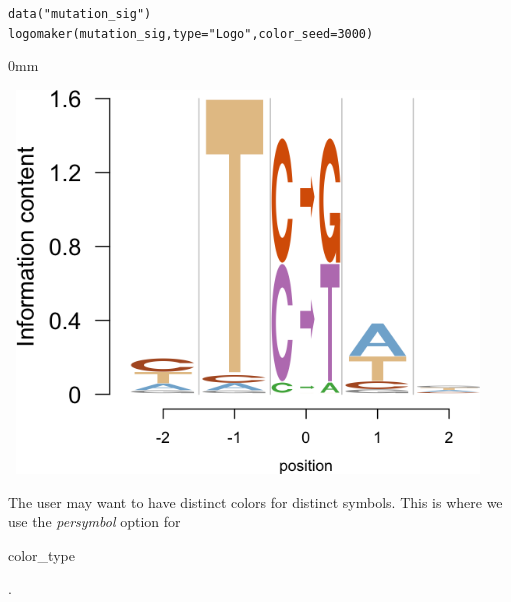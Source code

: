 \documentclass[12pt]{article}\usepackage[]{graphicx}\usepackage[usenames,dvipsnames]{color}
\newcommand{\hlnum}[1]{\textcolor[rgb]{0.816,0.125,0.439}{#1}}%
\newcommand{\hlstr}[1]{\textcolor[rgb]{0.251,0.627,0.251}{#1}}%
\newcommand{\hlstd}[1]{\textcolor[rgb]{0.251,0.251,0.251}{#1}}%
\newcommand{\hlkwc}[1]{\textcolor[rgb]{0.251,0.251,0.251}{#1}}%
\newcommand{\hlkwd}[1]{\textcolor[rgb]{0.878,0.439,0.125}{#1}}%
\newenvironment{knitrout}{}{} %
\begin{document}
\begin{knitrout}
\color{fgcolor}\begin{kframe}
\begin{alltt}
\hlkwd{data}\hlstd{(}\hlstr{"mutation_sig"}\hlstd{)}
\hlkwd{logomaker}\hlstd{(mutation_sig,} \hlkwc{type} \hlstd{=} \hlstr{"Logo"}\hlstd{,} \hlkwc{color_seed} \hlstd{=} \hlnum{3000}\hlstd{)}
\end{alltt}
\end{kframe}\begin{adjustwidth}{\fltoffset}{0mm}

\includegraphics[width=5in,height=4in]{figure/mutsig2-1} \hfill{}

\end{adjustwidth}
\end{knitrout}

The user may want to have distinct colors for distinct symbols. This is where we use the \textit{persymbol}
option for  \begin{verb} color_type \end{verb}.
\end{document}
